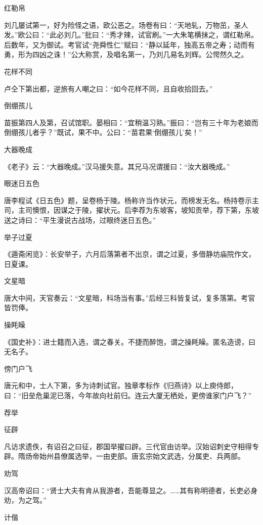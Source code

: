 \documentclass[a4paper,12pt,UTF8,twoside]{ctexbook}
\begin{document}
    红勒帛
    
    刘几屡试第一，好为险怪之语，欧公恶之。场卷有曰：“天地轧，万物茁，圣人发。”欧公曰：“此必刘几。”批曰：“秀才辣，试官刷。”一大朱笔横抹之，谓红勒帛。后数年，又为御试。考官试“尧舜性仁”赋曰：“静以延年，独高五帝之寿；动而有勇，形为四凶之诛！”公大称赏，及唱名第一，乃刘几易名刘辉。公愕然久之。
    
    花样不同
    
    卢仝下第出都，逆旅有人嘲之曰：“如今花样不同，且自收拾回去。”
    
    倒绷孩儿
    
    苗振第四人及第，召试馆职。晏相曰：“宜稍温习熟。”振曰：“岂有三十年为老娘而倒绷孩儿者乎？”既试，果不中。公曰：“苗君果‘倒绷孩儿’矣！”
    
    大器晚成
    
    《老子》云：“大器晚成。”汉马援失意。其兄马况谓援曰：“汝大器晚成。”
    
    眼迷日五色
    
    唐李程试《日五色》题，呈卷杨于陵。杨称许当作状元，而榜发无名。杨持卷示主司，主司懊恨，因谋之于陵，擢状元。后李荐为东坡客，坡知贡举，荐下第，东坡送之诗曰：“平生漫说古战场，过眼终迷日五色。”
    
    举子过夏
    
    《遁斋闲览》：长安举子，六月后落第者不出京，谓之过夏，多借静坊庙院作文，日夏课。
    
    文星暗
    
    唐大中间，天官奏云：“文星暗，科场当有事。”后经三科皆复试，复多落第。考官皆罚俸。
    
    操眊矂
    
    《国史补》：进士籍而入选，谓之春关。不捷而醉饱，谓之操眊矂。匿名造谤，曰无名子。
    
    傍门户飞
    
    唐元和中，士人下第，多为诗刺试官。独章孝标作《归燕诗》以上庾侍郎，曰：“旧垒危巢泥已落，今年故向社前归。连云大厦无栖处，更傍谁家门户飞？”
    
    荐举
    
    征辟
    
    凡访求遗佚，有诏召之曰征，郡国举擢曰辟。三代官由访举。汉始诏刺史守相得专辟。隋炀帝始州县僚属选举，一由吏部。唐玄宗始文武选，分属吏、兵两部。
    
    劝驾
    
    汉高帝诏曰：“贤士大夫有肯从我游者，吾能尊显之。……其有称明德者，长吏必身劝，为之驾。”
    
    计偕
    
\end{document}
